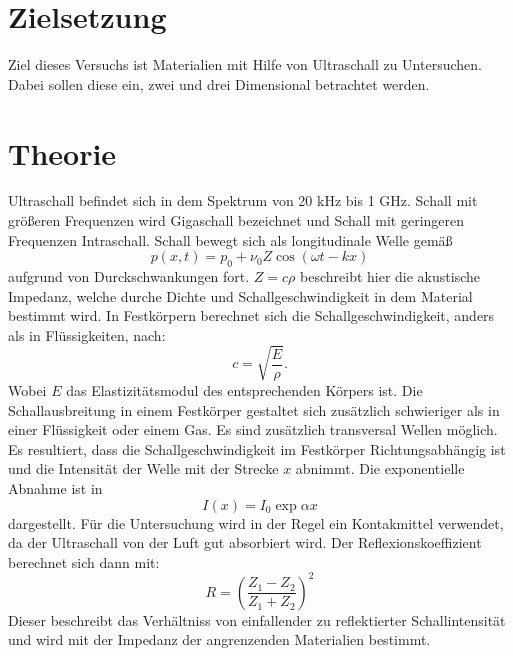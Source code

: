 \section{Zielsetzung}
Ziel dieses Versuchs ist Materialien mit Hilfe von Ultraschall zu Untersuchen.
Dabei sollen diese ein, zwei und drei Dimensional betrachtet werden.
\section{Theorie}
\label{sec:Theorie}
Ultraschall befindet sich in dem Spektrum von 20 kHz bis 1 GHz.
Schall mit größeren Frequenzen wird Gigaschall bezeichnet und Schall mit geringeren Frequenzen Intraschall.
Schall bewegt sich als longitudinale Welle gemäß
\begin{equation}
  p(x,t) = p_0 + \nu_0 Z \cos{(\omega t - k x)}
\end{equation}
 aufgrund von Durckschwankungen fort.
 $Z=c \rho$ beschreibt hier die akustische Impedanz, welche durche Dichte und Schallgeschwindigkeit in dem Material bestimmt wird.
 In Festkörpern berechnet sich die Schallgeschwindigkeit, anders als in Flüssigkeiten, nach:
 \begin{equation}
  c=\sqrt{\frac{E}{\rho}}   .
 \end{equation}
Wobei $E$ das Elastizitätsmodul des entsprechenden Körpers ist.
Die Schallausbreitung in einem Festkörper gestaltet sich zusätzlich schwieriger als in einer Flüssigkeit oder einem Gas.
Es sind zusätzlich transversal Wellen möglich.
Es resultiert, dass die Schallgeschwindigkeit im Festkörper Richtungsabhängig ist und die Intensität der Welle mit der Strecke $x$ abnimmt.
Die exponentielle Abnahme ist in
\begin{equation}
  I(x) = I_0 \exp{\alpha x}
\end{equation}
dargestellt.
Für die Untersuchung wird in der Regel ein Kontakmittel verwendet, da der Ultraschall von der Luft gut absorbiert wird.
Der Reflexionskoeffizient berechnet sich dann mit:
\begin{equation}
  R=(\frac{Z_1 - Z_2}{Z_1 + Z_2})^2
\end{equation}
Dieser beschreibt das Verhältniss von einfallender zu reflektierter Schallintensität und wird mit der Impedanz der angrenzenden Materialien bestimmt.
